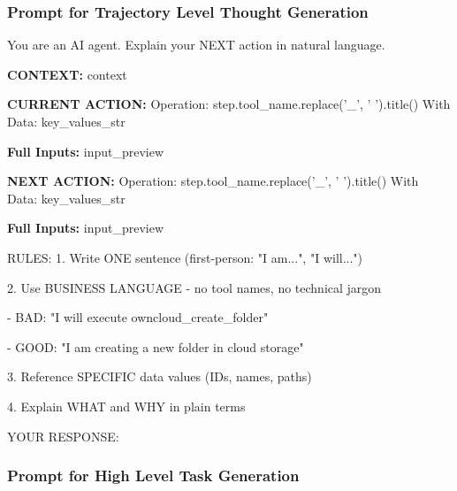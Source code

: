\documentclass{article}
\theoremstyle{plain}
\theoremstyle{definition}
\theoremstyle{remark}
\begin{document}
\subsubsection{Prompt for Trajectory Level Thought Generation}
\label{app:thought_prompt}
\begin{tcolorbox}[
    enhanced,
    breakable,
    width=\linewidth,
    title=Prompt for Trajectory Level Thought Generation,
    fonttitle=\bfseries\normalsize,  %
    colframe=blue!75!black,
    colback=white!10!white,
    coltitle=white,
    colbacktitle=blue!85!black,
    boxrule=0.2mm,
    sharp corners,
    shadow={1mm}{-1mm}{0mm}{black!50!white},
    attach boxed title to top left={yshift=-2mm, xshift=3mm},  %
    boxed title style={sharp corners, size=small},
    top=3mm,  %
    bottom=2mm  %
]

\small
\ttfamily %
\setlength{\parindent}{0pt} %
\setlength{\parskip}{0.5em} %

You are an AI agent. Explain your NEXT action in natural language.


\textbf{CONTEXT:}
{context}


\textbf{CURRENT ACTION:}
Operation: {step.tool\_name.replace('\_', ' ').title()}
With Data: {key\_values\_str}


\textbf{Full Inputs:}
{input\_preview}

\textbf{NEXT ACTION:}
Operation: {step.tool\_name.replace('\_', ' ').title()}
With Data: {key\_values\_str}


\textbf{Full Inputs:}
{input\_preview}

RULES:
1. Write ONE sentence (first-person: "I am...", "I will...")


2. Use BUSINESS LANGUAGE - no tool names, no technical jargon

    - BAD: "I will execute owncloud\_create\_folder"

    - GOOD: "I am creating a new folder in cloud storage"

3. Reference SPECIFIC data values (IDs, names, paths)

4. Explain WHAT and WHY in plain terms


YOUR RESPONSE:
\end{tcolorbox}
\subsubsection{Prompt for High Level Task Generation}
\label{app:high_prompt}
\end{document}
